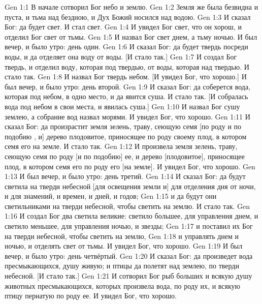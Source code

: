 \vs Gen 1:1 В начале сотворил Бог небо и землю.
\vs Gen 1:2 Земля же была безвидна и пуста, и тьма над бездною, и Дух Божий носился над водою.
\rsbpar\vs Gen 1:3 И сказал Бог: да будет свет. И стал свет.
\vs Gen 1:4 И увидел Бог свет, что он хорош, и отделил Бог свет от тьмы.
\vs Gen 1:5 И назвал Бог свет днем, а тьму ночью. И был вечер, и было утро: день один.
\rsbpar\vs Gen 1:6 И сказал Бог: да будет твердь посреди воды, и да отделяет она воду от воды. [И стало так.]
\vs Gen 1:7 И создал Бог твердь, и отделил воду, которая под твердью, от воды, которая над твердью. И стало так.
\vs Gen 1:8 И назвал Бог твердь небом. [И увидел Бог, что  хорошо.] И был вечер, и было утро: день второй.
\rsbpar\vs Gen 1:9 И сказал Бог: да соберется вода, которая под небом, в одно место, и да явится суша. И стало так. [И собралась вода под небом в свои места, и явилась суша.]
\vs Gen 1:10 И назвал Бог сушу землею, а собрание вод назвал морями. И увидел Бог, что  хорошо.
\vs Gen 1:11 И сказал Бог: да произрастит земля зелень, траву, сеющую семя [по роду и по подобию , и] дерево плодовитое, приносящее по роду своему плод, в котором семя его на земле. И стало так.
\vs Gen 1:12 И произвела земля зелень, траву, сеющую семя по роду [и по подобию] ее, и дерево [плодовитое], приносящее плод, в котором семя его по роду его [на земле]. И увидел Бог, что  хорошо.
\vs Gen 1:13 И был вечер, и было утро: день третий.
\rsbpar\vs Gen 1:14 И сказал Бог: да будут светила на тверди небесной [для освещения земли и] для отделения дня от ночи, и для знамений, и времен, и дней, и годов;
\vs Gen 1:15 и да будут они светильниками на тверди небесной, чтобы светить на землю. И стало так.
\vs Gen 1:16 И создал Бог два светила великие: светило большее, для управления днем, и светило меньшее, для управления ночью, и звезды;
\vs Gen 1:17 и поставил их Бог на тверди небесной, чтобы светить на землю,
\vs Gen 1:18 и управлять днем и ночью, и отделять свет от тьмы. И увидел Бог, что  хорошо.
\vs Gen 1:19 И был вечер, и было утро: день четвёртый.
\rsbpar\vs Gen 1:20 И сказал Бог: да произведет вода пресмыкающихся, душу живую; и птицы да полетят над землею, по тверди небесной. [И стало так.]
\vs Gen 1:21 И сотворил Бог рыб больших и всякую душу животных пресмыкающихся, которых произвела вода, по роду их, и всякую птицу пернатую по роду ее. И увидел Бог, что  хорошо.
